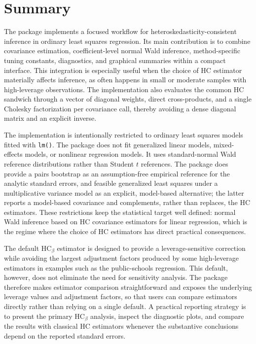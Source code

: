 \section{Summary}\label{summary}

The  package implements a focused workflow for heteroskedasticity-consistent inference in ordinary least squares regression. Its main contribution is to combine covariance estimation, coefficient-level normal Wald inference, method-specific tuning constants, diagnostics, and graphical summaries within a compact interface. This integration is especially useful when the choice of HC estimator materially affects inference, as often happens in small or moderate samples with high-leverage observations. The implementation also evaluates the common HC sandwich through a vector of diagonal weights, direct cross-products, and a single Cholesky factorization per covariance call, thereby avoiding a dense diagonal matrix and an explicit inverse.

The implementation is intentionally restricted to ordinary least squares models fitted with \texttt{lm()}. The package does not fit generalized linear models, mixed-effects models, or nonlinear regression models. It uses standard-normal Wald reference distributions rather than Student \(t\) references. The package does provide a pairs bootstrap as an assumption-free empirical reference for the analytic standard errors, and feasible generalized least squares under a multiplicative variance model as an explicit, model-based alternative; the latter reports a model-based covariance and complements, rather than replaces, the HC estimators. These restrictions keep the statistical target well defined: normal Wald inference based on HC covariance estimators for linear regression, which is the regime where the choice of HC estimators has direct practical consequences.

The default \(\text{HC}_\beta\) estimator is designed to provide a leverage-sensitive correction while avoiding the largest adjustment factors produced by some high-leverage estimators in examples such as the public-schools regression. This default, however, does not eliminate the need for sensitivity analysis. The package therefore makes estimator comparison straightforward and exposes the underlying leverage values and adjustment factors, so that users can compare estimators directly rather than relying on a single default. A practical reporting strategy is to present the primary \(\text{HC}_\beta\) analysis, inspect the diagnostic plots, and compare the results with classical HC estimators whenever the substantive conclusions depend on the reported standard errors.

